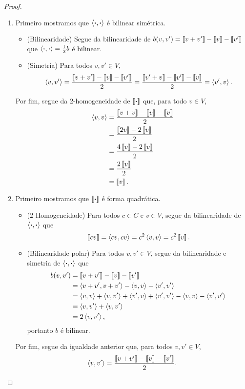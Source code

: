 \begin{proof}
	\begin{enumerate}
	\item Primeiro mostramos que $\inte{\var}{\var}$ é bilinear simétrica.
		\begin{itemize}
		\item (Bilinearidade) Segue da bilinearidade de $b(v,v') = \qua{v+v'} - \qua{v} - \qua{v'}$ que $\inte{\var}{\var} = \frac{1}{2}b$ é bilinear.
		\item (Simetria) Para todos $v,v' \in V$,
			\begin{align*}
			\inte{v}{v'} = \frac{\qua{v+v'} - \qua{v} - \qua{v'}}{2} = \frac{\qua{v'+v} - \qua{v'} - \qua{v}}{2} = \inte{v'}{v}.
			\end{align*}
		\end{itemize}
	Por fim, segue da $2$-homogeneidade de $\qua{\var}$ que, para todo $v \in V$,
		\begin{align*}
		\inte{v}{v} &= \frac{\qua{v+v} - \qua{v} - \qua{v}}{2} \\
			&= \frac{\qua{2v} - 2\qua{v}}{2} \\
			&= \frac{4\qua{v} - 2\qua{v}}{2} \\
			&= \frac{2\qua{v}}{2} \\
			&= \qua{v}.
		\end{align*}
	
	\item Primeiro mostramos que $\qua{\var}$ é forma quadrática.
		\begin{itemize}
			\item ($2$-Homogeneidade) Para todos $c \in C$ e $v \in V$, segue da bilinearidade de $\inte{\var}{\var}$ que
				\begin{equation*}
				\qua{cv} = \inte{cv}{cv} = c^2\inte{v}{v} = c^2\qua{v}.
				\end{equation*}
			\item (Bilinearidade polar) Para todos $v,v' \in V$, segue da bilinearidade e simetria de $\inte{\var}{\var}$ que
				\begin{align*}
				b(v,v') &= \qua{v+v'} - \qua{v} - \qua{v'} \\
					&= \inte{v+v'}{v+v'} - \inte{v}{v} - \inte{v'}{v'} \\
					&= \inte{v}{v} + \inte{v}{v'} + \inte{v'}{v} + \inte{v'}{v'} - \inte{v}{v} - \inte{v'}{v'} \\
					&= \inte{v}{v'} + \inte{v}{v'} \\
					&= 2\inte{v}{v'},
				\end{align*}
			portanto $b$ é bilinear.
		\end{itemize}
	Por fim, segue da igualdade anterior que, para todos $v,v' \in V$,
		\begin{equation*}
		\inte{v}{v'} = \frac{\qua{v+v'} - \qua{v} - \qua{v'}}{2}.
		\qedhere
		\end{equation*}
	\end{enumerate}
\end{proof}


